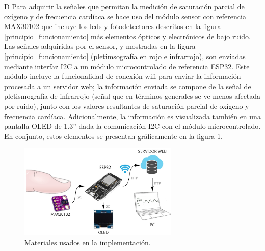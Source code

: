 \documentclass[journal]{IEEEtran}
\begin{document}
{\color{blue}D}
Para adquirir la señales que permitan la medición de saturación parcial de oxígeno y de frecuencia cardíaca se hace uso del módulo sensor con referencia MAX30102 que incluye los leds y fotodetectores descritos en la figura \ref{principio_funcionamiento} más elementos ópticos y electrónicos de bajo ruido. Las señales adquiridas por el sensor, y mostradas en la figura \ref{principio_funcionamiento} (pletimsografía en rojo e infrarrojo), son enviadas mediante interfaz I2C a un  módulo microcontrolado de referencia ESP32. Este módulo incluye la funcionalidad de conexión wifi para enviar la información procesada a un servidor web;  la información enviada se compone de  la señal de pletismografía de infrarrojo (señal que en términos generales se ve menos afectada por ruido), junto con los valores resultantes de saturación parcial de oxígeno y frecuencia cardíaca. Adicionalmente, la información es visualizada también en una pantalla OLED de 1.3'' dada la comunicación I2C con el módulo microcontrolado. En conjunto, estos elementos se presentan gráficamente en la figura \ref{materiales}.
  


\begin{figure}[!h]
	\centering
	\includegraphics[width=3in]{Materiales.png}
	\caption{Materiales usados en la implementación.}
	\label{materiales}
\end{figure}



\end{document}
